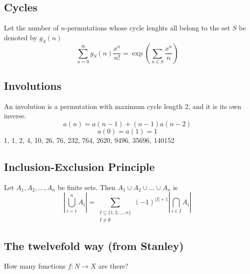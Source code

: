 



\subsection{Cycles}
		Let the number of $n$-permutations whose cycle lenghts all belong to the set $S$ be denoted by $g_S (n)$
		\small
		$$\sum_{n=0} ^\infty g_S(n) \frac{x^n}{n!} = \exp\left(\sum_{n\in S} \frac{x^n}{n} \right)$$
		\normalsize

\subsection{Involutions}
    An involution is a permutation with maximum cycle length 2, and it is its own inverse. 
    $$a(n) = a(n-1) + (n-1)a(n-2)$$
    $$a(0) = a(1) = 1$$
    1, 1, 2, 4, 10, 26, 76, 232, 764, 2620, 9496, 35696, 140152\\
\subsection{Inclusion-Exclusion Principle}
	Let $A_1, A_2, ..., A_n$ be finite sets. Then  $A_1 \cup A_2 \cup ... \cup A_n$ is
	\[ \left| \bigcup^n_{i = 1} A_i \right|  = \sum_{\substack{I \subseteq \{1, 2, ..., n\}\\ I 
	\neq \emptyset}}^{} (-1)^{\left| I \right| +1} \left| \bigcap\limits_{i\in I} A_i \right| \]

\subsection{The twelvefold way (from Stanley)} 
How many functions $f \colon N \rightarrow X$ are there?


